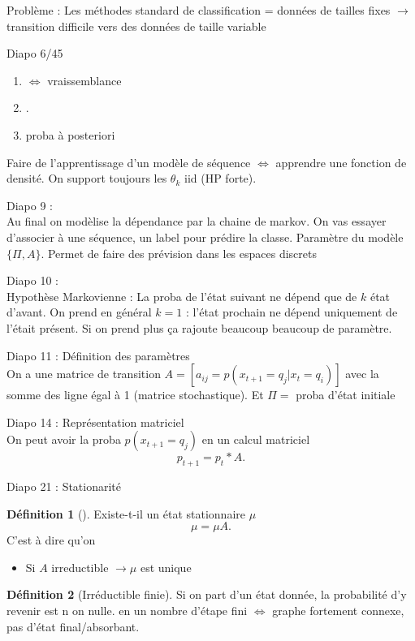 \documentclass{article}
\theoremstyle{plain}%
\theoremstyle{definition}
\newtheorem{defn}{Définition}[section]
\theoremstyle{remark}
\begin{document}
Problème : Les méthodes standard de classification = données de tailles fixes $\rightarrow$ transition difficile vers des données de taille variable

Diapo 6/45 
\begin{enumerate}
    \item $ \Leftrightarrow $ vraissemblance
    \item .
    \item proba à posteriori
\end{enumerate}
Faire de l'apprentissage d'un modèle de séquence $ \Leftrightarrow $ apprendre une fonction de densité. On support toujours les $ \theta _k $ iid (HP forte).

Diapo 9 : \\
Au final on modèlise la dépendance par la chaine de markov. On vas essayer d'associer à une séquence, un label pour prédire la classe. Paramètre du modèle $ \{\Pi, A\} $. Permet de faire des prévision dans les espaces discrets

Diapo 10 : \\
Hypothèse Markovienne : La proba de l'état suivant ne dépend que de $ k $ état d'avant. On prend en général $ k=1 $ : l'état prochain ne dépend uniquement de l'était présent. Si on prend plus ça rajoute beaucoup beaucoup de paramètre.

Diapo 11 : Définition des paramètres \\
On a une matrice de transition $ A = [a_{ij} = p(x_{t+1} = q_j| x_t =q_i)]$ avec la somme des ligne égal à 1 (matrice stochastique). Et $ \Pi =  $ proba d'état initiale

Diapo 14 : Représentation matriciel \\
On peut avoir la proba $ p(x_{t+1} = q_j) $ en un calcul matriciel 
\[
    p_{t+1} = p_t * A
.\]

Diapo 21 : Stationarité
\begin{defn}[]
    Existe-t-il un état stationnaire $ \mu  $ 
    \[
        \mu = \mu A
    .\]
    C'est à dire qu'on 
    \begin{itemize}
        \item Si $ A $ irreductible $\rightarrow \mu $ est unique 
    \end{itemize}
\end{defn}

\begin{defn}[Irréductible finie]
    Si on part d'un état donnée, la probabilité d'y revenir est n on nulle. en un nombre d'étape fini $ \Leftrightarrow $ graphe fortement connexe, pas d'état final/absorbant.
\end{defn}
\end{document}
